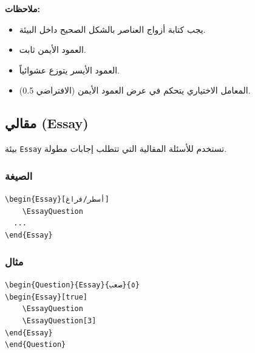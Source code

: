 \documentclass[a4paper]{article}
\begin{document}
\textbf{ملاحظات:}
\begin{itemize}
    \item يجب كتابة أزواج العناصر بالشكل الصحيح داخل البيئة.
    \item العمود الأيمن ثابت.
    \item العمود الأيسر يتوزع عشوائياً.
    \item المعامل الاختياري يتحكم في عرض العمود الأيمن (الافتراضي \textenglish{0.5}).
\end{itemize}

\subsection{مقالي (Essay)}

بيئة \texttt{Essay} تستخدم للأسئلة المقالية التي تتطلب إجابات مطولة.

\subsubsection*{الصيغة}

\begin{LTR}\ttfamily
\verb|\begin{Essay}[أسطر/فراغ]|\\
\verb|    \EssayQuestion|\\
\verb|  ...|\\
\verb|\end{Essay}|
\end{LTR}

\subsubsection*{مثال}

\begin{LTR}\ttfamily
\verb|\begin{Question}{Essay}{صعب}{٥}|\\
\verb|\begin{Essay}[true]|\\
\verb|    \EssayQuestion|\\
\verb|    \EssayQuestion[3]|\\
\verb|\end{Essay}|\\
\verb|\end{Question}|
\end{LTR}
\end{document}
